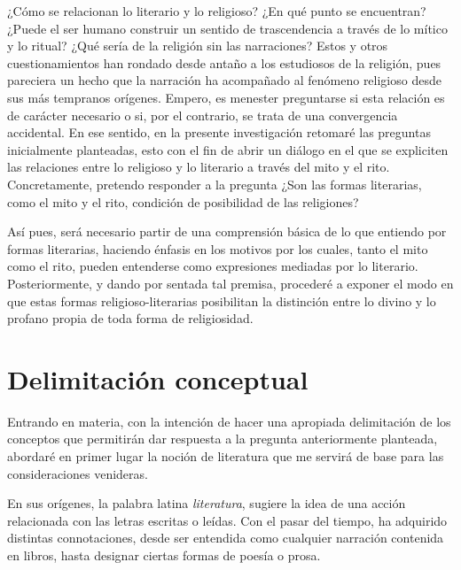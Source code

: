 \begin{refsection}

¿Cómo se relacionan lo literario y lo religioso? ¿En qué punto se encuentran? ¿Puede el ser humano construir un sentido de trascendencia a través de lo mítico y lo ritual? ¿Qué sería de la religión sin las narraciones? Estos y otros cuestionamientos han rondado desde antaño a los estudiosos de la religión, pues pareciera un hecho que la narración ha acompañado al fenómeno religioso desde sus más tempranos orígenes. Empero, es menester preguntarse si esta relación es de carácter necesario o si, por el contrario, se trata de una convergencia accidental. En ese sentido, en la presente investigación retomaré las preguntas inicialmente planteadas, esto con el fin de abrir un diálogo en el que se expliciten las relaciones entre lo religioso y lo literario a través del mito y el rito. Concretamente, pretendo responder a la pregunta ¿Son las formas literarias, como el mito y el rito, condición de posibilidad de las religiones?

Así pues, será necesario partir de una comprensión básica de lo que entiendo por formas literarias, haciendo énfasis en los motivos por los cuales, tanto el mito como el rito, pueden entenderse como expresiones mediadas por lo literario. Posteriormente, y dando por sentada tal premisa, procederé a exponer el modo en que estas formas religioso-literarias posibilitan la distinción entre lo divino y lo profano propia de toda forma de religiosidad.

\section{Delimitación conceptual}

Entrando en materia, con la intención de hacer una apropiada delimitación de los conceptos que permitirán dar respuesta a la pregunta anteriormente planteada, abordaré en primer lugar la noción de literatura que me servirá de base para las consideraciones venideras.

En sus orígenes, la palabra latina \emph{literatura}, sugiere la idea de una acción relacionada con las letras escritas o leídas. Con el pasar del tiempo, ha adquirido distintas connotaciones, desde ser entendida como cualquier narración contenida en libros, hasta designar ciertas formas de poesía o prosa.


\end{refsection}
